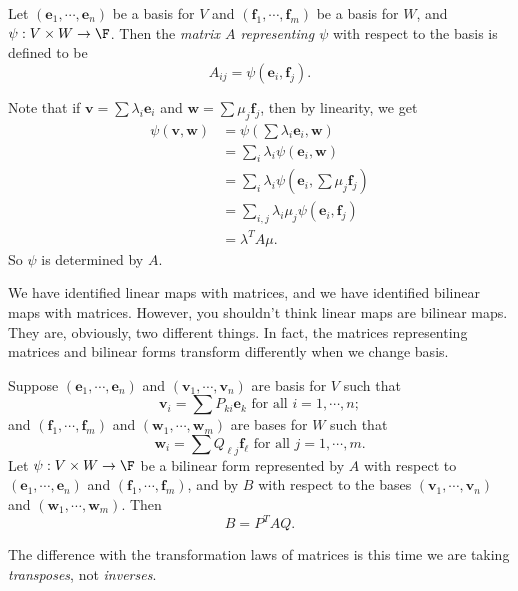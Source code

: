 \documentclass[a4paper]{article}
\begin{document}
\begin{defi}
  Let $(\mathbf{e}_1, \cdots, \mathbf{e}_n)$ be a basis for $V$ and $(\mathbf{f}_1, \cdots, \mathbf{f}_m)$ be a basis for $W$, and $\psi: V\times W \to \F$. Then the \emph{matrix $A$ representing $\psi$} with respect to the basis is defined to be
  \[
    A_{ij} = \psi(\mathbf{e}_i, \mathbf{f}_j).
  \]
\end{defi}
Note that if $\mathbf{v} = \sum \lambda_i \mathbf{e}_i$ and $\mathbf{w} = \sum \mu_j \mathbf{f}_j$, then by linearity, we get
\begin{align*}
  \psi(\mathbf{v}, \mathbf{w}) &= \psi\left(\sum \lambda_i \mathbf{e}_i, \mathbf{w}\right) \\
  &= \sum_i \lambda_i \psi(\mathbf{e}_i, \mathbf{w})\\
  &= \sum_i \lambda_i \psi\left(\mathbf{e}_i, \sum \mu_j \mathbf{f}_j\right)\\
  &= \sum_{i, j} \lambda_i \mu_j \psi(\mathbf{e}_i, \mathbf{f}_j)\\
  &= \lambda^T A \mu.
\end{align*}
So $\psi$ is determined by $A$.

We have identified linear maps with matrices, and we have identified bilinear maps with matrices. However, you shouldn't think linear maps are bilinear maps. They are, obviously, two different things. In fact, the matrices representing matrices and bilinear forms transform differently when we change basis.

\begin{prop}
  Suppose $(\mathbf{e}_1, \cdots, \mathbf{e}_n)$ and $(\mathbf{v}_1, \cdots, \mathbf{v}_n)$ are basis for $V$ such that
  \[
    \mathbf{v}_i = \sum P_{ki}\mathbf{e}_k\text{ for all }i = 1,\cdots, n;
  \]
  and $(\mathbf{f}_1, \cdots, \mathbf{f}_m)$ and $(\mathbf{w}_1, \cdots, \mathbf{w}_m)$ are bases for $W$ such that
  \[
    \mathbf{w}_i = \sum Q_{\ell j} \mathbf{f}_\ell\text{ for all }j = 1, \cdots, m.
  \]
  Let $\psi: V\times W \to \F$ be a bilinear form represented by $A$ with respect to $(\mathbf{e}_1, \cdots, \mathbf{e}_n)$ and $(\mathbf{f}_1, \cdots, \mathbf{f}_m)$, and by $B$ with respect to the bases $(\mathbf{v}_1, \cdots, \mathbf{v}_n)$ and $(\mathbf{w}_1, \cdots, \mathbf{w}_m)$. Then
  \[
    B = P^T AQ.
  \]
\end{prop}
The difference with the transformation laws of matrices is this time we are taking \emph{transposes}, not \emph{inverses}.
\end{document}
